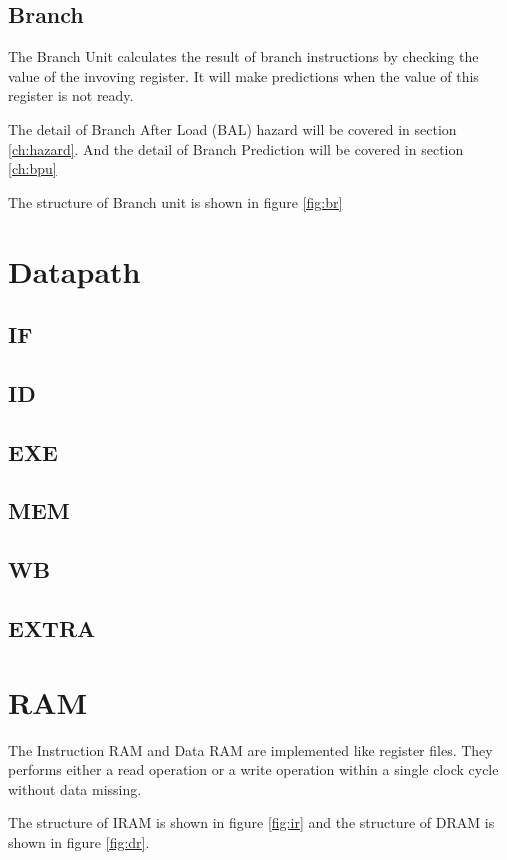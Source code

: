 \subsection[Branch]{Branch}
The Branch Unit calculates the result of branch instructions by checking the value
of the invoving register. It will make predictions when the value of this register
is not ready.

The detail of Branch After Load (BAL) hazard will be covered in section \ref{ch:hazard}. And the
detail of Branch Prediction will be covered in section \ref{ch:bpu}

The structure of Branch unit is shown in figure \ref{fig:br}

\section[Datapath]{Datapath}

\subsection[IF]{IF}
\subsection[ID]{ID}
\subsection[EXE]{EXE}
\subsection[MEM]{MEM}
\subsection[WB]{WB}
\subsection[EXTRA]{EXTRA}

\section[RAM]{RAM}
The Instruction RAM and Data RAM are implemented like register files. They performs
either a read operation or a write operation within a single clock cycle without
data missing.

The structure of IRAM is shown in figure \ref{fig:ir} and the structure of DRAM
is shown in figure \ref{fig:dr}. 

